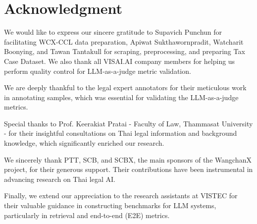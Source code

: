 \section{Acknowledgment}
\label{sec: acknowledgement}

We would like to express our sincere gratitude to Supavich Punchun for facilitating WCX-CCL data preparation, Apiwat Sukthawornpradit, Watcharit Boonying, and Tawan Tantakull for scraping, preprocessing, and preparing Tax Case Dataset. We also thank all VISAI.AI company members for helping us perform quality control for LLM-as-a-judge metric validation.

We are deeply thankful to the legal expert annotators for their meticulous work in annotating samples, which was essential for validating the LLM-as-a-judge metrics.

Special thanks to Prof. Keerakiat Pratai - Faculty of Law, Thammasat University - for their insightful consultations on Thai legal information and background knowledge, which significantly enriched our research.

We sincerely thank PTT, SCB, and SCBX, the main sponsors of the WangchanX project, for their generous support. Their contributions have been instrumental in advancing research on Thai legal AI.

Finally, we extend our appreciation to the research assistants at VISTEC for their valuable guidance in constructing benchmarks for LLM systems, particularly in retrieval and end-to-end (E2E) metrics.